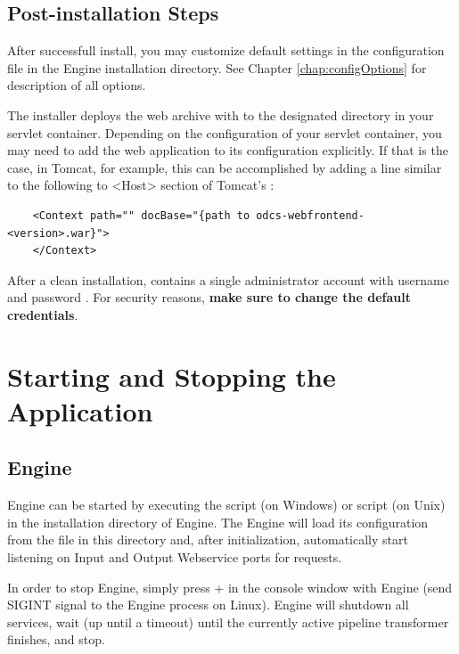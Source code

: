 \FloatBarrier


\section{Post-installation Steps}
After successfull install, you may customize default \odcs settings in the configuration file  in the Engine installation directory. See Chapter \ref{chap:configOptions} for description of all options.

The installer deploys the web archive with \FE to the designated directory in your servlet container. Depending on the configuration of your servlet container, you may need to add the \FE web application to its configuration explicitly. If that is the case, in Tomcat, for example, this can be accomplished by adding a line similar to the following to \textless{}Host\textgreater{} section of Tomcat's :  
\begin{verbatim} 
    <Context path="" docBase="{path to odcs-webfrontend-<version>.war}">
    </Context>
\end{verbatim} 

After a clean installation, \FE contains a single administrator account with username  and password . For security reasons, \textbf{make sure to change the default credentials}.

\chapter{Starting and Stopping the Application}
\section{Engine}
\odcs Engine can be started by executing the  script (on Windows) or  script (on Unix) in the installation directory of \odcs Engine. The Engine will load its configuration from the  file in this directory and, after initialization, automatically start listening on Input and Output Webservice ports for requests.

In order to stop Engine, simply press + in the console window with Engine (send SIGINT signal to the Engine process on Linux). Engine will shutdown all services, wait (up until a timeout) until the currently active pipeline transformer finishes, and stop.

